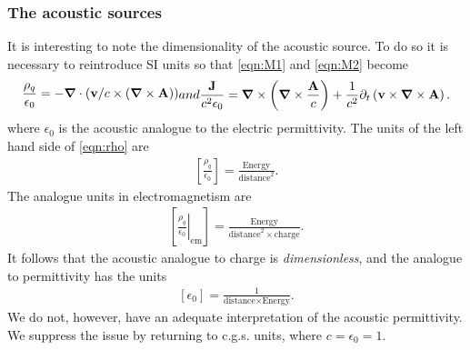 \documentclass[10pt, fleqn,final,showtrims,oldfontcommands]{article} %
\newcommand{\sub}[1]{\begin{subequations}#1\end{subequations}}
\newcommand{\eqnref}[1]{\ref{eqn:#1}}
\newcommand{\lr}[1]{\left( #1 \right)}
\newcommand{\lrsquare}[1]{\left[ #1 \right]}
\renewcommand{\d}{\partial}
\newcommand{\del}{\nabla}
\newcommand{\vdel}{ \mbox{\boldmath $\del$}}
\newcommand{\given}[2]{ \left.{#1}\right|_{#2}  }
\newcommand{\dt}{{\d_t}}
\newcommand{\vJ}{\vect J}
\newcommand{\vect}[1]{\mathbf{#1}}
\newcommand{\vA}{\textbf{A}}
\newcommand{\vv}{\textbf{v}}
\begin{document}
\subsubsection{The acoustic sources}



It is interesting to note the dimensionality of the acoustic source.
To do so it is necessary to reintroduce SI units so that \eqnref{M1} and \eqnref{M2} become
\sub{
\begin{align}
  \frac{\rho_q}{\epsilon_0} = -\vdel \cdot\lr{ \vv/c \times \lr{\vdel \times \vA}} \label{eqn:rho}
\end{align}
and 
\begin{align}
 \frac{\vJ}{c^2 \epsilon_0} = \vdel \times \lr{\vdel\times \frac{\vA}{c}} + \frac{1}{c^2}\dt \lr{ \vv \times \vdel \times \vA}.\label{eqn:vJ}
\end{align}
}
where $\epsilon_0$ is the acoustic analogue to the electric permittivity.
The units of the left hand side of \eqnref{rho} are
\begin{align}
  \lrsquare{\frac{\rho_q}{\epsilon_0}} = \frac{\text{Energy}}{\text{distance}^2}.
\end{align}
The analogue units in electromagnetism are 
\begin{align}
\lrsquare{\given { \frac{\rho_q}{\epsilon_0}}{\text{em}}} =  \frac{\text{Energy}}{\text{distance}^2\times \text{charge}}.
\end{align}
It follows that the acoustic analogue to charge is {\em dimensionless},
and the analogue to permittivity has the units 
\begin{align}
\lrsquare{\epsilon_0} = \frac{1}{\text{distance}\times\text{Energy}}.
\end{align}
We do not, however, have an adequate interpretation of the acoustic permittivity.
We suppress the issue by  returning to c.g.s. units, where $c= \epsilon_0 = 1$.
\end{document}
